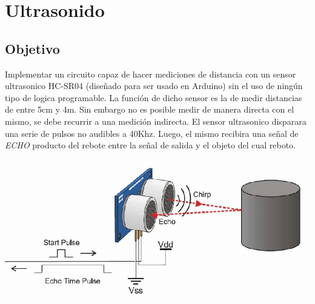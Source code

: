\chapter{Ultrasonido}

\section{Objetivo}
Implementar un circuito capaz de hacer mediciones de distancia con un sensor ultrasonico HC-SR04 (diseñado para ser usado en Arduino) sin el uso de ningún tipo de logica programable. La función de dicho sensor es la de medir distancias de entre 5cm y 4m. Sin embargo no es posible medir de manera directa con el mismo, se debe recurrir a una medición indirecta. El sensor ultrasonico disparara una serie de pulsos no audibles a 40Khz. Luego, el mismo recibira una señal de \emph{ECHO} producto del rebote entre la señal de salida y el objeto del cual reboto. 
\begin{center}
\includegraphics[scale=0.5]{../8-UltraSound/HC-SR04 diagram.png}
\end{center}
